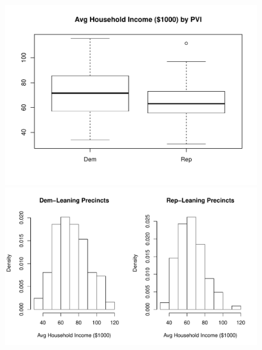 \documentclass[addpoints,12pt]{exam}
\begin{document}
\begin{questions}
\newpage
\begin{figure}[h]
  \centering
  \includegraphics[scale=0.75]{final_May_2016_boxplot}\\
  \vspace{1em}
  \includegraphics[scale=0.75]{final_May_2016_histograms}
\end{figure}

\end{questions}
\end{document}
